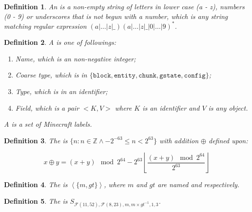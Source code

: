 \documentclass{book}
\newtheorem{definition}{Definition}
\theoremstyle{definition}\newtheorem{mechanism}{Mechanism}
\theoremstyle{remark}\newtheorem*{remark}{Remark}
\begin{document}
\begin{definition}
	An  is a non-empty string of letters in lower case (a - z), numbers (0 - 9) or underscores that is not begun with a number, which is any string matching regular expression $(a|\dots|z|\_)(a|\dots|z|\_|0|\dots|9)^*$.
\end{definition}

\begin{definition}
	A  is one of followings:
	
	\begin{enumerate}
		\item Name, which is an non-negative integer;
		\item Coarse type, which is in $\{\mathtt{block}, \mathtt{entity}, \mathtt{chunk}, \mathtt{gstate}, \mathtt{config}\}$;
		\item Type, which is in an identifier;
		\item Field, which is a pair $<K, V>$ where $K$ is an identifier and $V$ is any object.
	\end{enumerate}
	
	A  is a set of Minecraft labels.
\end{definition}

\begin{definition}
	The  is $\{n: n\in \mathbb Z \land -2^{-63} \le n < 2^{63}\}$ with addition $\oplus$ defined upon:
	
	\begin{equation*}
		x \oplus y = (x + y)\mod {2^{64}} - 2^{63}\left\lfloor\frac{(x + y)\mod {2^{64}} }{2^{63}}\right\rfloor
	\end{equation*}
\end{definition}

\begin{definition}
	The  is $\left<\{m, gt\}\right>$, where $m$ and $gt$ are named  and  respectively.
\end{definition}

\begin{definition}
	The  is $S_{\mathcal F(11, 52), \mathcal F(8, 23), m, m\times gt^{-1}, 1, 3}$.
\end{definition}
\end{document}
